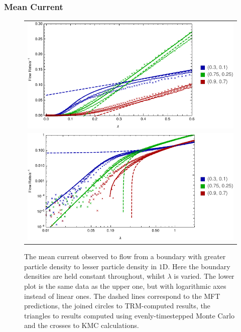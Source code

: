 \subsubsection{Mean Current}
\begin{figure} \caption[The current flowing through systems as we vary $\lambda$ with constant boundaries,
$1$D]{The mean current observed to flow from a boundary with greater particle density to lesser particle 
density in $1$D. Here the boundary densities are held constant throughout, whilst $\lambda$ is varied.
The lower plot is the same data as the upper one, but with logarithmic axes instead of linear ones.
The dashed lines
correspond to the MFT predictions, the joined circles to TRM-computed results, the triangles to results
computed using evenly-timestepped Monte Carlo and the crosses to KMC calculations.} 
\label{fig:1DlambdaScans}
\begin{center}
\begin{tabular}{c} 
\includegraphics[width=1.1\linewidth]{numerics/images/lambdaScan/allDataLinear} \\
\includegraphics[width=1.1\linewidth]{numerics/images/lambdaScan/allData} \\
\end{tabular}
\end{center}
\end{figure}


